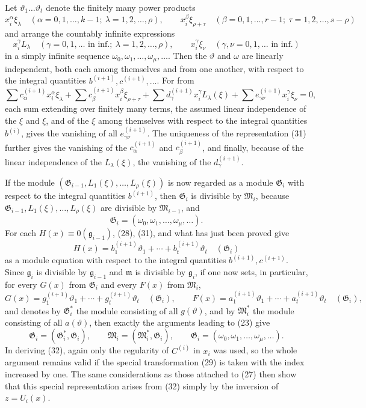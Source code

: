 \documentclass[11pt]{article}
\providecommand{\Gmod}{\mathfrak G}
\providecommand{\mideal}{\mathfrak m}
\providecommand{\gideal}{\mathfrak g}
\providecommand{\Gmod}{\mathfrak G}
\providecommand{\Mmod}{\mathfrak M}
\providecommand{\mideal}{\mathfrak m}
\providecommand{\gideal}{\mathfrak g}
\begin{document}
Let $\vartheta_1\ldots\vartheta_t$ denote the finitely many power products
\[
 x_i^\alpha\xi_\lambda\quad(\alpha=0,1,\ldots,k-1;\ \lambda=1,2,\ldots,\rho),\qquad
 x_i^\beta\xi_{\rho+\tau}\quad(\beta=0,1,\ldots,r-1;\ \tau=1,2,\ldots,s-\rho)
\]
and arrange the countably infinite expressions
\[
 x_i^\gamma L_\lambda\quad(\gamma=0,1,\ldots\text{ in inf.};\ \lambda=1,2,\ldots,\rho),
 \qquad
 x_i^\gamma\xi_\nu\quad(\gamma,
\nu=0,1,
\ldots\text{ in inf.})
\]
in a simply infinite sequence $\omega_0,\omega_1,\ldots,\omega_\mu,\ldots$. Then the $\vartheta$ and $\omega$ are linearly independent, both each among themselves and from one another, with respect to the integral quantities $b^{(i+1)},c^{(i+1)},\ldots$. For from
\[
 \sum c^{(i+1)}_\alpha x_i^\alpha\xi_\lambda+
 \sum c^{(i+1)}_\beta x_i^\beta\xi_{\rho+\tau}+
 \sum d^{(i+1)}_\gamma x_i^\gamma L_\lambda(\xi)+
 \sum e^{(i+1)}_{\gamma\nu}x_i^\gamma\xi_\nu=0,
\]
each sum extending over finitely many terms, the assumed linear independence of the $\xi$ and $\xi$, and of the $\xi$ among themselves with respect to the integral quantities $b^{(i)}$, gives the vanishing of all $e^{(i+1)}_{\gamma\nu}$. The uniqueness of the representation (31) further gives the vanishing of the $c^{(i+1)}_\alpha$ and $c^{(i+1)}_\beta$, and finally, because of the linear independence of the $L_\lambda(\xi)$, the vanishing of the $d^{(i+1)}_\gamma$.

If the module $(\Gmod_{i-1},L_1(\xi),\ldots,L_\rho(\xi))$ is now regarded as a module $\Gmod_i$ with respect to the integral quantities $b^{(i+1)}$, then $\Gmod_i$ is divisible by $\Mmod_i$, because $\Gmod_{i-1},L_1(\xi),\ldots,L_\rho(\xi)$ are divisible by $\Mmod_{i-1}$, and
\[
 \Gmod_i=(\omega_0,\omega_1,\ldots,\omega_\mu,\ldots).
\]
For each $H(x)\equiv0(\gideal_{i-1})$, (28), (31), and what has just been proved give
\[
 H(x)=b^{(i+1)}_1\vartheta_1+\cdots+b^{(i+1)}_t\vartheta_t\quad(\Gmod_i)
\]
as a module equation with respect to the integral quantities $b^{(i+1)},c^{(i+1)}$. Since $\gideal_i$ is divisible by $\gideal_{i-1}$ and $\mideal$ is divisible by $\gideal_i$, if one now sets, in particular, for every $G(x)$ from $\Gmod_i$ and every $F(x)$ from $\Mmod_i$,
\[
 G(x)=g^{(i+1)}_1\vartheta_1+\cdots+g^{(i+1)}_t\vartheta_t\quad(\Gmod_i),
 \qquad
 F(x)=a^{(i+1)}_1\vartheta_1+\cdots+a^{(i+1)}_t\vartheta_t\quad(\Gmod_i),
\]
and denotes by $\Gmod_i^*$ the module consisting of all $g(\vartheta)$, and by $\Mmod_i^*$ the module consisting of all $a(\vartheta)$, then exactly the arguments leading to (23) give
\begin{equation}
 \Gmod_i=(\Gmod_i^*,\Gmod_i),\qquad
 \Mmod_i=(\Mmod_i^*,\Gmod_i),\qquad
 \Gmod_i=(\omega_0,\omega_1,\ldots,\omega_\mu,\ldots).
\tag{32}
\end{equation}
In deriving (32), again only the regularity of $C^{(i)}$ in $x_i$ was used, so the whole argument remains valid if the special transformation (29) is taken with the index increased by one. The same considerations as those attached to (27) then show that this special representation arises from (32) simply by the inversion of $z=U_i(x)$.
\end{document}
